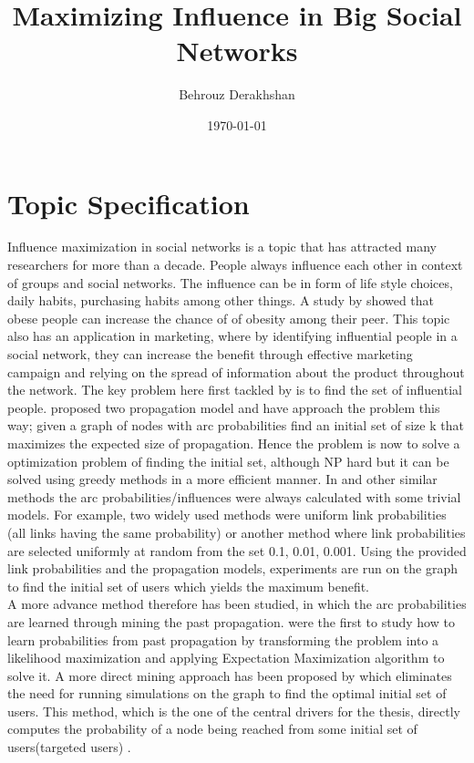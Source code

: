 \documentclass[english]{tktltiki}
\begin{document}
\onehalfspacing

\title{Maximizing Influence in Big Social Networks}
\author{Behrouz Derakhshan}
\date{\today}

\maketitle


\section{Topic Specification}
Influence maximization in social networks is a topic that has attracted many researchers for more than a decade. People always influence each other in context of groups and social networks. The influence can be in form of life style choices, daily habits, purchasing habits among other things. A study by \cite{christ07} showed that obese people can increase the chance of of obesity among their peer. This topic also has an application in marketing, where by identifying influential people in a social network, they can increase the benefit through effective marketing campaign and relying on the spread of information about the product throughout the network. The key problem here first tackled by \cite{domingo01} is to find the set of influential people. 
\cite{kempe03} proposed two propagation model and have approach the problem this way; given a graph of nodes with arc probabilities find an initial set of size k that maximizes the expected size of propagation. Hence the problem is now to solve a optimization problem of finding the initial set, although NP hard but it can be solved using greedy methods in a more efficient manner. In \cite{kempe03} and other similar methods the arc probabilities/influences were always calculated with some trivial models. For example, two widely used methods were uniform link probabilities (all links having the same probability) or another method where link probabilities are selected uniformly at random from the set {0.1, 0.01, 0.001}. Using the provided link probabilities and the propagation models, experiments are run on the graph to find the initial set of users which yields the maximum benefit.  \\
A more advance method therefore has been studied, in which the arc probabilities are learned through mining the past propagation. \cite{saito08} were the first to study how to learn probabilities from past propagation by transforming the problem into a likelihood maximization and applying Expectation Maximization algorithm to solve it. A more direct mining approach has been proposed by \cite{goyal11} which eliminates the need for running simulations on the graph to find the optimal initial set of users. This method, which is the one of the central drivers for the thesis, directly computes the probability of a node being reached from some initial set of users(targeted users) . \\
\end{document}
